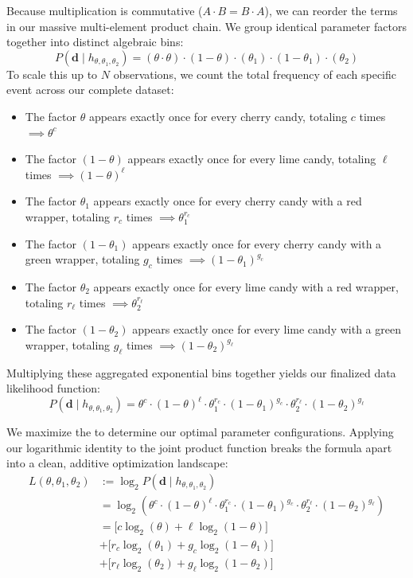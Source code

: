 Because multiplication is commutative ($A \cdot B = B \cdot A$), we can reorder the terms in our massive multi-element product chain. We group identical parameter factors together into distinct algebraic bins:
\[
P(\mathbf{d} \mid h_{\theta, \theta_1, \theta_2}) = (\theta \cdot \theta) \cdot (1-\theta) \cdot (\theta_1) \cdot (1-\theta_1) \cdot (\theta_2)
\]
To scale this up to $N$ observations, we count the total frequency of each specific event across our complete dataset:
\begin{itemize}
    \item The factor $\theta$ appears exactly once for every cherry candy, totaling $c$ times $\implies \theta^c$
    \item The factor $(1-\theta)$ appears exactly once for every lime candy, totaling $\ell$ times $\implies (1-\theta)^{\ell}$
    \item The factor $\theta_1$ appears exactly once for every cherry candy with a red wrapper, totaling $r_c$ times $\implies \theta_1^{r_c}$
    \item The factor $(1-\theta_1)$ appears exactly once for every cherry candy with a green wrapper, totaling $g_c$ times $\implies (1-\theta_1)^{g_c}$
    \item The factor $\theta_2$ appears exactly once for every lime candy with a red wrapper, totaling $r_{\ell}$ times $\implies \theta_2^{r_{\ell}}$
    \item The factor $(1-\theta_2)$ appears exactly once for every lime candy with a green wrapper, totaling $g_{\ell}$ times $\implies (1-\theta_2)^{g_{\ell}}$
\end{itemize}

Multiplying these aggregated exponential bins together yields our finalized data likelihood function:
\[
P(\mathbf{d} \mid h_{\theta, \theta_1, \theta_2}) = \theta^c \cdot (1-\theta)^{\ell} \cdot \theta_1^{r_c} \cdot (1-\theta_1)^{g_c} \cdot \theta_2^{r_{\ell}} \cdot (1-\theta_2)^{g_{\ell}}
\]


We maximize the  to determine our optimal parameter configurations. Applying our logarithmic identity to the joint product function breaks the formula apart into a clean, additive optimization landscape:
\begin{align*}
L(\theta, \theta_1, \theta_2) &:= \log_2 P(\mathbf{d} \mid h_{\theta, \theta_1, \theta_2}) \\
&= \log_2 \left( \theta^c \cdot (1-\theta)^{\ell} \cdot \theta_1^{r_c} \cdot (1-\theta_1)^{g_c} \cdot \theta_2^{r_{\ell}} \cdot (1-\theta_2)^{g_{\ell}} \right) \\
&= \Big[ c \log_2(\theta) + \ell \log_2(1-\theta) \Big] \\ 
&+ \Big[ r_c \log_2 (\theta_1) + g_c \log_2 (1-\theta_1) \Big] \\ 
&+ \Big[ r_{\ell} \log_2 (\theta_2) + g_{\ell} \log_2 (1-\theta_2) \Big]
\end{align*}


